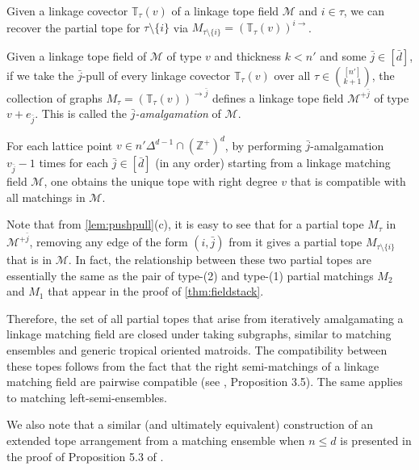 \documentclass[letterpaper,reqno,11pt]{amsart}
\begin{document}
\begin{proposition}\label{prop:ipush}
    Given a linkage covector $\mathbb{T}_{\tau}(v)$ of a linkage tope field $\mathcal{M}$ and $i\in \tau$, we can recover the partial tope for $\tau\setminus\{i\}$ via $M_{\tau\setminus\{i\}} = (\mathbb{T}_{\tau}(v))^{i\rightarrow}$.
\end{proposition}

\begin{proposition}
    Given a linkage tope field of $\mathcal{M}$ of type $v$ and thickness $k < n'$ and some $\bar{j}\in [\bar{d}]$, if we take the $\bar{j}$-pull of every linkage covector $\mathbb{T}_{\tau}(v)$ over all $\tau\in \binom{[n']}{k+1}$, the collection of graphs $M_\tau = (\mathbb{T}_{\tau}(v))^{\rightarrow \bar{j}}$ defines a linkage tope field $\mathcal{M}^{+\bar{j}}$ of type $v + e_{\bar{j}}$. This is called the \emph{$\bar{j}$-amalgamation} of $\mathcal{M}$.
\end{proposition}

\begin{corollary}
    For each lattice point $v\in n'\Delta^{d-1}\cap (\mathbb{Z}^+)^d$, by performing $\bar{j}$-amalgamation $v_{\bar{j}}-1$ times for each $\bar{j}\in [\bar{d}]$ (in any order) starting from a linkage matching field $\mathcal{M}$, one obtains the unique tope with right degree $v$ that is compatible with all matchings in $\mathcal{M}$.
\end{corollary}

\begin{remark}
    Note that from \cref{lem:pushpull}(c), it is easy to see that for a partial tope $M_\tau$ in $\mathcal{M}^{+\bar{j}}$, removing any edge of the form $(i, \bar{j})$ from it gives a partial tope $M_{\tau\setminus\{i\}}$ that is in $\mathcal{M}$. In fact, the relationship between these two partial topes are essentially the same as the pair of type-(2) and type-(1) partial matchings $M_2$ and $M_1$ that appear in the proof of \cref{thm:fieldstack}. 
    
    Therefore, the set of all partial topes that arise from iteratively amalgamating a linkage matching field are closed under taking subgraphs, similar to matching ensembles and generic tropical oriented matroids. The compatibility between these topes follows from the fact that the right semi-matchings of a linkage matching field are pairwise compatible (see \cite{FieldLattice}, Proposition 3.5). The same applies to matching left-semi-ensembles.

    We also note that a similar (and ultimately equivalent) construction of an extended tope arrangement from a matching ensemble when $n\leq d$ is presented in the proof of Proposition 5.3 of \cite{Ensembles}.
\end{remark}
\end{document}
